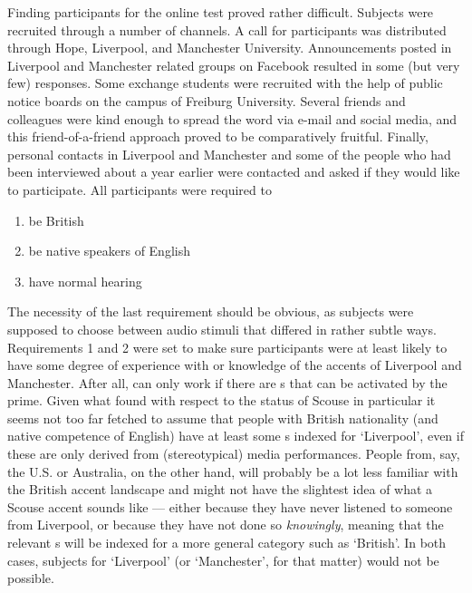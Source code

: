 Finding participants for the online test proved rather difficult.
Subjects were recruited through a number of channels.
A call for participants was distributed through Hope, Liverpool, and Manchester University.
Announcements posted in Liverpool and Manchester related groups on Facebook resulted in some (but very few) responses.
Some exchange students were recruited with the help of public notice boards on the campus of Freiburg University.
Several friends and colleagues were kind enough to spread the word via e-mail and social media, and this friend-of-a-friend approach proved to be comparatively fruitful.
Finally, personal contacts in Liverpool and Manchester and some of the people who had been interviewed about a year earlier were contacted and asked if they would like to participate.
All participants were required to
\begin{enumerate}
	\item be British
	\item be native speakers of English
	\item have normal hearing
\end{enumerate}
The necessity of the last requirement should be obvious, as subjects were supposed to choose between audio stimuli that differed in rather subtle ways.
Requirements 1 and 2 were set to make sure participants were at least likely to have some degree of experience with or knowledge of the accents of Liverpool and Manchester.
After all,   can only work if there are s that can be activated by the prime.
Given what \textcite{montgomery2007} found with respect to the status of Scouse in particular it seems not too far fetched to assume that people with British nationality (and native competence of English) have at least some s indexed for `Liverpool', even if these are only derived from (stereotypical) media performances.
People from, say, the U.S. or Australia, on the other hand, will probably be a lot less familiar with the British accent landscape and might not have the slightest idea of what a Scouse accent sounds like --- either because they have never listened to someone from Liverpool, or because they have not done so \emph{knowingly}, meaning that the relevant s will be indexed for a more general category such as `British'.
In both cases,  subjects for `Liverpool' (or `Manchester', for that matter) would not be possible.

